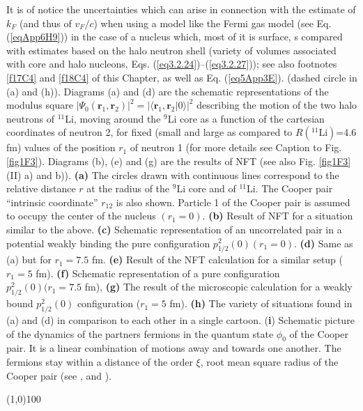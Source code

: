 {         	It is of notice the uncertainties which can arise in connection with the estimate of $k_F$ (and thus of $v_F/c$) when using a model like the Fermi gas model (see Eq. (\ref{eqApp6H9})) in the case of a nucleus which, most of it is surface, s compared with estimates based on the halo neutron shell (variety of volumes associated with core and halo nucleons, Eqs. (\ref{eq3.2.24})--(\ref{eq3.2.27})); see also footnotes \ref{f17C4} and \ref{f18C4} of this Chapter, as well as Eq. (\ref{eq5App3E}).    
         } (dashed circle in (a) and (h)). Diagrams (a) and (d) are the schematic representations of the modulus square $|\Psi_0(\mathbf r_1, \mathbf r_2)|^2=|\langle\mathbf r_1, \mathbf r_2|0\rangle|^2$ describing the motion of the two halo neutrons of $^{11}$Li, moving around the $^{9}$Li core as a function of the cartesian coordinates of neutron 2, for fixed (small and large as compared to $R(^{11}\text{Li})$=4.6 fm) values of the position $r_1$ of neutron 1 (for more details see Caption to Fig. \ref{fig1F3}). Diagrams (b), (e) and (g) are the results of NFT (see also Fig. \ref{fig1F3} (II) a) and b)). \textbf{(a)} The  circles drawn with continuous lines correspond to the relative distance $r$ at the radius of the $^{9}$Li core and of $^{11}$Li. The Cooper pair ``intrinsic coordinate'' $r_{12}$ is also shown. Particle 1 of the Cooper pair is assumed to occupy the center of the nucleus $(r_1=0)$. \textbf{(b)} Result of NFT for a situation similar to the above. \textbf{(c)} Schematic representation of an uncorrelated pair in a potential weakly binding the pure configuration $p^2_{1/2}(0) (r_1=0)$. \textbf{(d)} Same as (a) but for $r_1=7.5$ fm. \textbf{(e)} Result of the NFT calculation for a similar setup ($r_1=5$ fm). \textbf{(f)} Schematic representation of a pure configuration $p^2_{1/2}(0) (r_1=7.5$ fm), \textbf{(g)} The result of the microscopic calculation for a weakly bound $p^2_{1/2}(0)$ configuration ($r_1=5$ fm). \textbf{(h)} The variety of situations found in (a) and (d) in comparison to each other in a single cartoon. (\textbf{i}) Schematic picture of the dynamics of the partners fermions in the quantum state $\phi_0$ of the Cooper pair. It is a linear combination of motions away and towards one another. The fermions stay within a distance of the order $\xi$, root mean square radius of the Cooper pair (see \cite{Weisskopf:81}, \cite{Kadin:07} and \cite{VanWitsen:14}).
\begin{center}
	\line(1,0){100}
\end{center}
         
